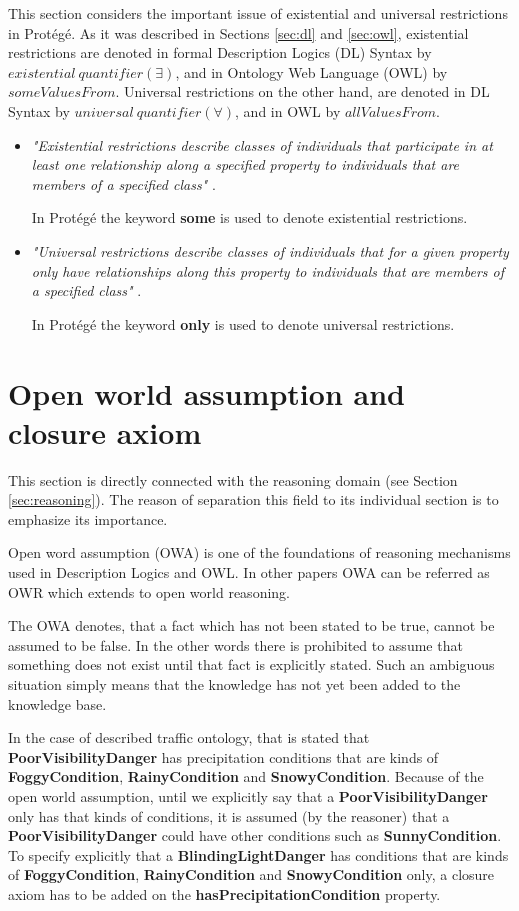 This section considers the important issue of existential and universal restrictions in Protégé. As it was described in Sections \ref{sec:dl} and \ref{sec:owl}, existential restrictions are denoted in formal Description Logics (DL) Syntax by $\mathit{existential~ quantifier} (\exists)$, and in Ontology Web Language (OWL) by $\mathit{someValuesFrom}$. Universal restrictions on the other hand, are denoted in DL Syntax by $\mathit{universal~ quantifier} (\forall)$, and in OWL by $\mathit{allValuesFrom}$.
\begin{itemize}
    \item \textit{"Existential restrictions describe classes of individuals that participate in at least one relationship along a specified property to individuals that are members of a specified class"} \cite{OWLGuide}. 

In Protégé the keyword \textbf{some} is used to denote existential restrictions.
    \item \textit{"Universal restrictions describe classes of individuals that for a given property only have relationships along this property to individuals that are members of a specified class"} \cite{OWLGuide}.

In Protégé the keyword \textbf{only} is used  to denote universal restrictions.
\end{itemize}

\section{Open world assumption and closure axiom}
\label{sec:openWorldAssumptionAndClosureAxiom}

This section is directly connected with the reasoning domain (see Section \ref{sec:reasoning}). The reason of separation this field to its individual section is to emphasize its importance.

Open word assumption (OWA) is one of the foundations of reasoning mechanisms used in Description Logics and OWL. In other papers OWA can be referred as OWR which extends to open world reasoning.

The OWA denotes, that a fact which has not been stated to be true, cannot be assumed to be false. In the other words there is prohibited to assume that something does not exist until that fact is explicitly stated. Such an ambiguous situation simply means that the knowledge has not yet been added to the knowledge base.

In the case of described traffic ontology, that is stated that \textbf{PoorVisibilityDanger} has precipitation conditions that are kinds of \textbf{FoggyCondition}, \textbf{RainyCondition} and \textbf{SnowyCondition}. Because of the open world assumption, until we explicitly say that a \textbf{PoorVisibilityDanger} only has that kinds of conditions, it is assumed (by the reasoner) that a \textbf{PoorVisibilityDanger} could have other conditions such as \textbf{SunnyCondition}. To specify explicitly that a \textbf{BlindingLightDanger} has conditions that are kinds of \textbf{FoggyCondition}, \textbf{RainyCondition} and \textbf{SnowyCondition} only, a closure axiom has to be added on the \textbf{hasPrecipitationCondition} property.

